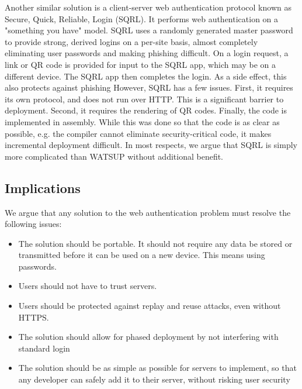Another similar solution is a client-server web authentication protocol known as Secure, Quick, Reliable, Login (SQRL). It performs web authentication on a "something you have" model. SQRL uses a randomly generated master password to provide strong, derived logins on a per-site basis, almost completely eliminating user passwords and making phishing difficult. On a login request, a link or QR code is provided for input to the SQRL app, which may be on a different device. The SQRL app then completes the login. As a side effect, this also protects against phishing \cite{Gibson:2016} However, SQRL has a few issues. First, it requires its own protocol, and does not run over HTTP. This is a significant barrier to deployment. Second, it requires the rendering of QR codes. Finally, the code is implemented in assembly. While this was done so that the code is as clear as possible, e.g. the compiler cannot eliminate security-critical code, it makes incremental deployment difficult. In most respects, we argue that SQRL is simply more complicated than WATSUP without additional benefit.

\subsection{Implications}
We argue that any solution to the web authentication problem must resolve the following issues:

\begin{itemize}

    \item The solution should be portable. It should not require any data be stored or transmitted before it can be used on a new device. This means using passwords.

    \item Users should not have to trust servers.

    \item Users should be protected against replay and reuse attacks, even without HTTPS.

    \item The solution should allow for phased deployment by not interfering with standard login

    \item The solution should be as simple as possible for servers to implement, so that any developer can safely add it to their server, without risking user security

\end{itemize}
